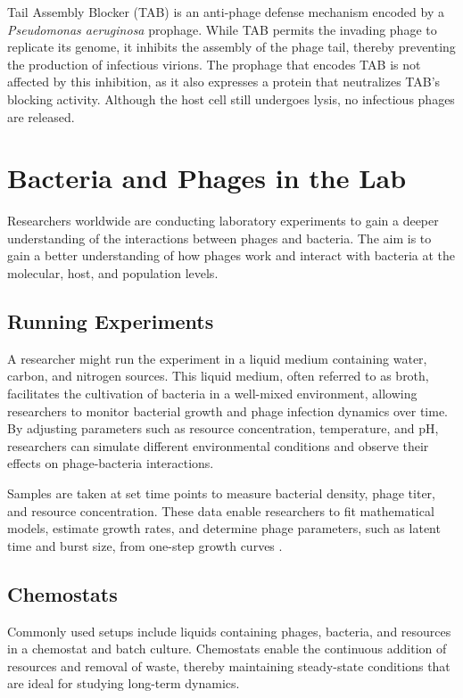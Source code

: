 Tail Assembly Blocker (TAB) is an anti-phage defense mechanism encoded by a \textit{Pseudomonas aeruginosa} prophage. 
While TAB permits the invading phage to replicate its genome, it inhibits the assembly of the phage tail, thereby preventing the production of infectious virions. 
The prophage that encodes TAB is not affected by this inhibition, as it also expresses a protein that neutralizes TAB's blocking activity. 
Although the host cell still undergoes lysis, no infectious phages are released.

\section{Bacteria and Phages in the Lab}
Researchers worldwide are conducting laboratory experiments to gain a deeper understanding of the interactions between phages and bacteria. 
The aim is to gain a better understanding of how phages work and interact with bacteria at the molecular, host, and population levels. 

\subsection{Running Experiments}
A researcher might run the experiment in a liquid medium containing water, carbon, and nitrogen sources. 
This liquid medium, often referred to as broth, facilitates the cultivation of bacteria in a well-mixed environment, allowing researchers to monitor bacterial growth and phage infection dynamics over time. 
By adjusting parameters such as resource concentration, temperature, and pH, researchers can simulate different environmental conditions and observe their effects on phage-bacteria interactions. 

Samples are taken at set time points to measure bacterial density, phage titer, and resource concentration. 
These data enable researchers to fit mathematical models, estimate growth rates, and determine phage parameters, such as latent time and burst size, from one-step growth curves \cite{gengUsingBacterialPopulation2024, mullaExtremeDiversityPhage2024}.

\subsection{Chemostats}
Commonly used setups include liquids containing phages, bacteria, and resources in a chemostat and batch culture. 
Chemostats enable the continuous addition of resources and removal of waste, thereby maintaining steady-state conditions that are ideal for studying long-term dynamics.

